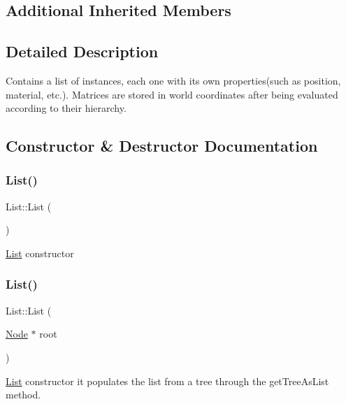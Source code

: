 \subsection*{Additional Inherited Members}


\subsection{Detailed Description}
Contains a list of instances, each one with its own properties(such as position, material, etc.). Matrices are stored in world coordinates after being evaluated according to their hierarchy. 

\subsection{Constructor \& Destructor Documentation}
\mbox{\label{classList_a64d878a92d11f7c63c70cbe4e7dd4176}} 
\subsubsection{\texorpdfstring{List()}{List()}\hspace{0.1cm}{\footnotesize\ttfamily [1/2]}}
{\footnotesize\ttfamily List\+::\+List (\begin{DoxyParamCaption}{ }\end{DoxyParamCaption})}

\hyperlink{classList}{List} constructor \mbox{\label{classList_ac4bdd9fca5382f2b13316f54e56484d7}} 
\subsubsection{\texorpdfstring{List()}{List()}\hspace{0.1cm}{\footnotesize\ttfamily [2/2]}}
{\footnotesize\ttfamily List\+::\+List (\begin{DoxyParamCaption}\item[{\hyperlink{classNode}{Node} $\ast$}]{root }\end{DoxyParamCaption})}

\hyperlink{classList}{List} constructor it populates the list from a tree through the get\+Tree\+As\+List method. \mbox{\label{classList_a70aecf37bd9d779a394e4d50377fbf5f}} 
